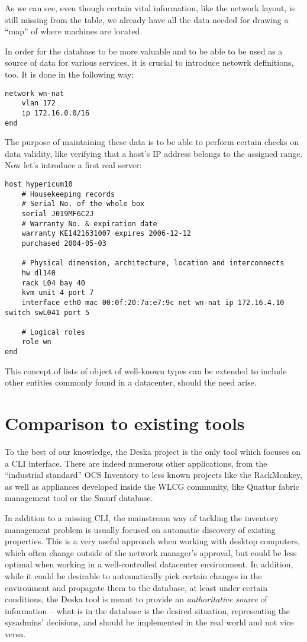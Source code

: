 \documentclass[11pt]{article}
\begin{document}
As we can see, even though certain vital information, like the network layout,
is still missing from the table, we already have all the data needed for drawing
a ``map'' of where machines are located.

In order for the database to be more valuable and to be able to be used as a
source of data for various services, it is crucial to introduce netowrk
definitions, too.  It is done in the following way:

{\scriptsize
\begin{verbatim}
network wn-nat
    vlan 172
    ip 172.16.0.0/16
end
\end{verbatim}
}

The purpose of maintaining these data is to be able to perform certain checks on
data validity, like verifying that a host's IP address belongs to the assigned
range.  Now let's introduce a first real server:

{\scriptsize
\begin{verbatim}
host hypericum10
    # Housekeeping records
    # Serial No. of the whole box
    serial J019MF6C2J
    # Warranty No. & expiration date
    warranty KE1421631007 expires 2006-12-12
    purchased 2004-05-03

    # Physical dimension, architecture, location and interconnects
    hw dl140
    rack L04 bay 40
    kvm unit 4 port 7
    interface eth0 mac 00:0f:20:7a:e7:9c net wn-nat ip 172.16.4.10 switch swL041 port 5

    # Logical roles
    role wn
end
\end{verbatim}
}

This concept of lists of object of well-known types can be extended to include
other entities commonly found in a datacenter, should the need arise.

\section{Comparison to existing tools}

To the best of our knowledge, the Deska project is the only tool which focuses on
a CLI interface.  There are indeed numerous other applications, from the
``industrial standard'' OCS Inventory to less known projects like the
RackMonkey, as well as appliances developed inside the WLCG community, like
Quattor fabric management tool or the Smurf database.

In addition to a missing CLI, the mainstream way of tackling the inventory
management problem is usually focused on automatic discovery of existing
properties.  This is a very useful approach when working with desktop computers,
which often change outside of the network manager's approval, but could be less
optimal when working in a well-controlled datacenter environment.  In addition,
while it could be desirable to automatically pick certain changes in the
environment and propagate them to the database, at least under certain
conditions, the Deska tool is meant to provide an {\em authoritative source} of
information -- what is in the database is the desired situation, representing
the sysadmins' decisions, and should be implemented in the real world and not
vice versa.
\end{document}
